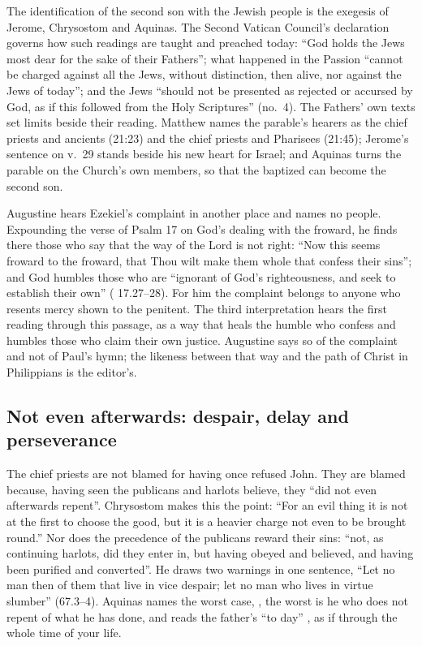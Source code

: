 The identification of the second son with the Jewish people is the exegesis of
Jerome, Chrysostom and Aquinas. The Second Vatican Council's declaration
 governs how such readings are taught and preached today:
``God holds the Jews most dear for the sake of their Fathers''; what happened
in the Passion ``cannot be charged against all the Jews, without distinction,
then alive, nor against the Jews of today''; and the Jews ``should not be
presented as rejected or accursed by God, as if this followed from the Holy
Scriptures'' (no.~4). The Fathers' own texts set limits beside their reading.
Matthew names the parable's hearers as the chief priests and ancients (21:23)
and the chief priests and Pharisees (21:45); Jerome's sentence on v.~29 stands
beside his new heart for Israel; and Aquinas turns the parable on the Church's
own members, so that the baptized can become the second son.

Augustine hears Ezekiel's complaint in another place and names no people.
Expounding the verse of Psalm 17 on God's dealing with the froward, he finds
there those who say that the way of the Lord is not right: ``Now this seems
froward to the froward, that Thou wilt make them whole that confess their
sins''; and God humbles those who are ``ignorant of God's righteousness, and
seek to establish their own'' ( 17.27--28). For
him the complaint belongs to anyone who resents mercy shown to the penitent.
The third interpretation hears the first reading through this passage, as a
way that heals the humble who confess and humbles those who claim their own
justice. Augustine says so of the complaint and not of Paul's hymn; the
likeness between that way and the path of Christ in Philippians is the
editor's.

\subsection{Not even afterwards: despair, delay and perseverance}

The chief priests are not blamed for having once refused John. They are
blamed because, having seen the publicans and harlots believe, they ``did not
even afterwards repent''. Chrysostom makes this the point: ``For an evil thing
it is not at the first to choose the good, but it is a heavier charge not even
to be brought round.'' Nor does the precedence of the publicans reward their
sins: ``not, as continuing harlots, did they enter in, but having obeyed and
believed, and having been purified and converted''. He draws two warnings in
one sentence, ``Let no man then of them that live in vice despair; let no man
who lives in virtue slumber'' (67.3--4). Aquinas names the worst case,
, the worst is he
who does not repent of what he has done, and reads the father's ``to day''
, as if through the whole time of your
life.


